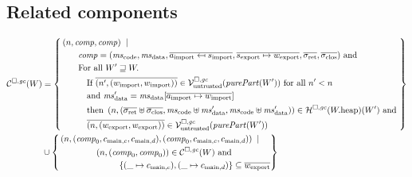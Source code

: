 \documentclass[a4paper]{article}
\begin{document}
\subsection{Related components}
\label{sec:related-components}

\begin{align*}
  \lrcomp(W) &=
  \left\{\begin{aligned}
     &\npair{\var{comp},\var{comp}} \;\mid \;\\
      &\qquad\var{comp} = (\mscode,\msdata,\overline{a_{\mathrm{import}} \mapsfrom s_{\mathrm{import}}},\overline{s_{\mathrm{export}} \mapsto w_{\mathrm{export}}},\sigrets,\sigcloss) \tand \\
      &\qquad\text{For all } W' \future W \ldotp \\
      &\qquad\quad\text{If } \overline{\npair[n']{(w_{\mathrm{import}},w_{\mathrm{import}})}} \in \lrv(\purePart{W'}) \text{ for all $n' < n$}\\
      &\qquad\quad\text{and } \msdata' = \msdata{}[\overline{a_{\mathrm{import}} \mapsto w_{\mathrm{import}}}] \\
      &\qquad\quad\text{then } \npair{(\sigrets\uplus\sigcloss,\mscode\uplus \msdata', \mscode\uplus\msdata')} \in \lrheap(\pwheap)(W') \tand\\
      &\qquad\quad\overline{\npair{(w_{\mathrm{export}},w_{\mathrm{export}})}} \in \lrv(\purePart{W'})
  \end{aligned}
    \right\}\\
  &\cup \left\{
    \begin{multlined}
     \npair{(\var{comp}_0,c_{\mathrm{main},c}, c_{\mathrm{main},d}),(\var{comp}_0,c_{\mathrm{main},c}, c_{\mathrm{main},d})} \;\mid \;\\
     \npair{(\var{comp}_0,\var{comp}_0)} \in \lrcomp(W) \tand\\
     \{(\_ \mapsto c_{\mathrm{main},c}),(\_ \mapsto c_{\mathrm{main},d})\} \subseteq \overline{w_{\mathrm{export}}}
       \end{multlined}
    \right\} 
\end{align*}
\end{document}
